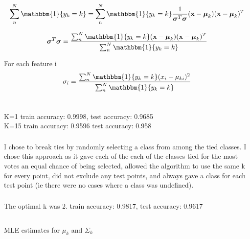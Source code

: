 \documentclass[12pt,letterpaper]{article} %
\newcommand{\bs}[1]{\bm{\mathrm{#1}}} %
\newcommand{\switch}[0]{\mathbbm{1}\{y_k=k\}}
\begin{document}
  \begin{equation*}
\sum^N_n\switch  = \sum^N_n\switch\frac{1}{\bs{\sigma}^T\bs{\sigma}}(\bs{x}-\bs{\mu}_k)(\bs{x}-\bs{\mu}_k)^T
 \end{equation*}
 
   \begin{equation*}
\bs{\sigma}^T\bs{\sigma} = \frac{\sum^N_n\switch(\bs{x}-\bs{\mu}_k)(\bs{x}-\bs{\mu}_k)^T}{\sum^N_n\switch}
 \end{equation*}
 
 For each feature i
 \begin{equation*}
\sigma_i = \frac{\sum^N_n\switch(x_i-\mu_{ki})^2}{\sum^N_n\switch}
 \end{equation*}
 
 \section{}
   \addtocounter{subsection}{1}
 \subsubsection{}
 K=1 train accuracy: 0.9998, test accuracy: 0.9685 \\
 K=15 train accuracy: 0.9596 test accuracy: 0.958\\
 
 \subsubsection {}
 
 I chose to break ties by randomly selecting a class from among the tied classes. I chose this approach as it gave each of the each of the classes tied for the most votes an equal chance of being selected, allowed the algorithm to use the same k for every point, did not exclude any test points, and always gave a class for each test point (ie there were no cases where a class was undefined). 
 
 \subsubsection{}
 
 The optimal k was 2. train accuracy: 0.9817, test accuracy: 0.9617
 
 \subsection{}
 
 MLE estimates for $\mu_k$ and $\Sigma_k$
 
\end{document}

